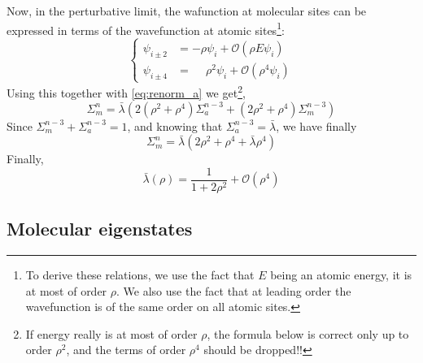 \documentclass[11pt]{article}
\begin{document}
Now, in the perturbative limit, the wafunction at molecular sites can be expressed in terms of the wavefunction at atomic sites\footnote{To derive these relations, we use the fact that $E$ being an atomic energy, it is at most of order $\rho$. We also use the fact that at leading order the wavefunction is of the same order on all atomic sites.}: 
\begin{equation}
	\begin{cases}
	\psi_{i\pm2} &= - \rho \psi_i + \mathcal{O}(\rho E \psi_i) \\
	\psi_{i\pm4} &= \phantom{-}\rho^2 \psi_i  + \mathcal{O}(\rho^4 \psi_i)
	\end{cases}
\end{equation}
Using this together with \eqref{eq:renorm_a} we get\footnote{If energy really is at most of order $\rho$, the formula below is correct only up to order $\rho^2$, and the terms of order $\rho^4$ should be dropped!!},
\begin{equation}
	\Sigma_m^n = \bar \lambda \left( 2(\rho^2 + \rho^4) \Sigma_a^{n-3} + (2 \rho^2 + \rho^4) \Sigma_m^{n-3} \right)
\end{equation}
Since $\Sigma_m^{n-3} + \Sigma_a^{n-3} = 1$, and knowing that $\Sigma_a^{n-3} = \bar \lambda$, we have finally
\begin{equation}
\boxed{
	\Sigma_m^n = \bar \lambda \left( 2 \rho^2 + \rho^4 + \bar \lambda \rho^4 \right)
}
\end{equation}
Finally,
\begin{equation}
	\bar \lambda(\rho) = \frac{1}{1+2\rho^2} +\mathcal{O}(\rho^4)
\end{equation}

\subsection{Molecular eigenstates}

\newpage

{}

\end{document}
